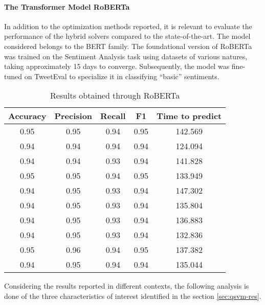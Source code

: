 \paragraph{The Transformer Model RoBERTa} In addition to the optimization methods reported, it is relevant to evaluate the performance of the hybrid solvers compared to the state-of-the-art. The model considered belongs to the BERT family. The foundational version of RoBERTa\cite{roberta-base} was trained on the Sentiment Analysis task using datasets of various natures, taking approximately 15 days to converge. Subsequently, the model was fine-tuned on TweetEval\cite{tweetRoberta}\cite{robertamodel} to specialize it in classifying ``basic'' sentiments.

\begin{table}[h]
    \centering
    \begin{tabular}{ccccc}
    \toprule
    Accuracy & Precision & Recall & F1    & Time to predict \\
    \midrule
    0.95     & 0.95      & 0.94   & 0.95  & 142.569         \\
    0.94     & 0.94      & 0.94   & 0.94  & 124.094         \\
    0.94     & 0.94      & 0.93   & 0.94  & 141.828         \\
    0.95     & 0.95      & 0.94   & 0.95  & 133.949         \\
    0.94     & 0.95      & 0.93   & 0.94  & 147.302         \\
    0.94     & 0.95      & 0.93   & 0.94  & 135.804         \\
    0.94     & 0.95      & 0.93   & 0.94  & 136.883         \\
    0.94     & 0.95      & 0.93   & 0.94  & 132.836         \\
    0.95     & 0.96      & 0.94   & 0.95  & 137.382         \\
    0.94     & 0.95      & 0.94   & 0.94  & 135.044         \\
    \bottomrule
    \end{tabular}
    \caption{Results obtained through RoBERTa}
    \label{tab:QSVM3}
\end{table}

Considering the results reported in different contexts, the following analysis is done of the three characteristics of interest identified in the section \ref{sec:qsvm-res}.

